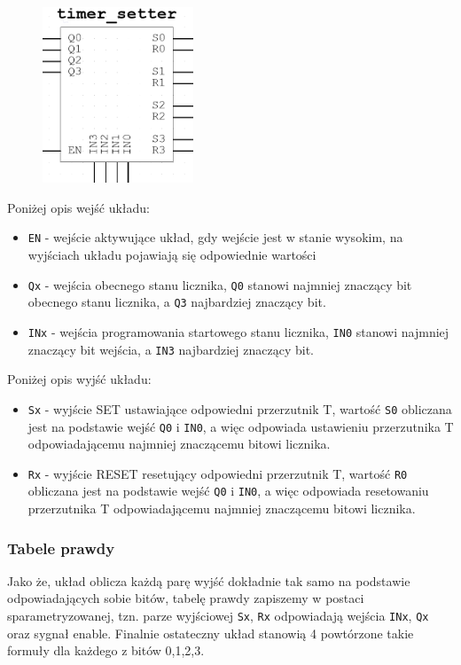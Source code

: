 \documentclass[a4paper]{article}
\begin{document}
\begin{figure}[H]
    \centering
    \includegraphics[width=0.4\textwidth]{timer_setter_black_box.png}
\end{figure}
Poniżej opis wejść układu:
\begin{itemize}
    \item \verb|EN| - wejście aktywujące układ, gdy wejście jest w stanie wysokim, na wyjściach układu
            pojawiają się odpowiednie wartości
    \item \verb|Qx| - wejścia obecnego stanu licznika, \verb|Q0| stanowi najmniej znaczący bit obecnego stanu licznika,
            a \verb|Q3| najbardziej znaczący bit.
    \item \verb|INx| - wejścia programowania startowego stanu licznika, \verb|IN0| stanowi najmniej znaczący bit wejścia,
            a \verb|IN3| najbardziej znaczący bit.
\end{itemize}

Poniżej opis wyjść układu:
\begin{itemize}
    \item \verb|Sx| - wyjście SET ustawiające odpowiedni przerzutnik T, wartość \verb|S0| obliczana
            jest na podstawie wejść \verb|Q0| i \verb|IN0|, a więc odpowiada ustawieniu przerzutnika T
            odpowiadającemu najmniej znaczącemu bitowi licznika.
    \item \verb|Rx| - wyjście RESET resetujący odpowiedni przerzutnik T, wartość \verb|R0| obliczana
            jest na podstawie wejść \verb|Q0| i \verb|IN0|, a więc odpowiada resetowaniu przerzutnika T
            odpowiadającemu najmniej znaczącemu bitowi licznika.
\end{itemize}

\subsubsection{Tabele prawdy}
Jako że, układ oblicza każdą parę wyjść dokładnie tak samo na podstawie odpowiadających sobie bitów,
tabelę prawdy zapiszemy w postaci sparametryzowanej, tzn. parze wyjściowej \verb|Sx|, \verb|Rx| odpowiadają
wejścia \verb|INx|, \verb|Qx| oraz sygnał enable. Finalnie ostateczny układ stanowią 4 powtórzone takie formuły 
dla każdego z bitów 0,1,2,3.
\end{document}
